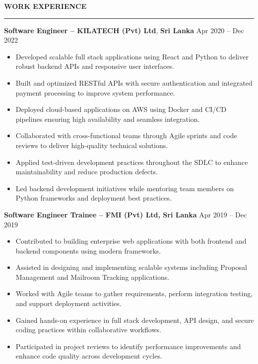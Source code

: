 \documentclass[10pt,letterpaper]{article}
\begin{document}
\textbf{WORK EXPERIENCE}\\[-8pt]
\noindent\rule{\textwidth}{1pt}

\vspace{-2pt}

\textbf{Software Engineer -- KILATECH (Pvt) Ltd}, \textbf{Sri Lanka} \hfill Apr 2020 -- Dec 2022

\vspace{-1pt}

\begin{itemize}
\item Developed scalable full stack applications using React and Python to deliver robust backend APIs and responsive user interfaces.
\item Built and optimized RESTful APIs with secure authentication and integrated payment processing to improve system performance.
\item Deployed cloud-based applications on AWS using Docker and CI/CD pipelines ensuring high availability and seamless integration.
\item Collaborated with cross-functional teams through Agile sprints and code reviews to deliver high-quality technical solutions.
\item Applied test-driven development practices throughout the SDLC to enhance maintainability and reduce production defects.
\item Led backend development initiatives while mentoring team members on Python frameworks and deployment best practices.
\end{itemize}

\textbf{Software Engineer Trainee -- FMI (Pvt) Ltd, Sri Lanka} \hfill Apr 2019 -- Dec 2019

\vspace{-1pt}

\begin{itemize}
\item Contributed to building enterprise web applications with both frontend and backend components using modern frameworks.
\item Assisted in designing and implementing scalable systems including Proposal Management and Mailroom Tracking applications.
\item Worked with Agile teams to gather requirements, perform integration testing, and support deployment activities.
\item Gained hands-on experience in full stack development, API design, and secure coding practices within collaborative workflows.
\item Participated in project reviews to identify performance improvements and enhance code quality across development cycles.
\end{itemize}
\end{document}
